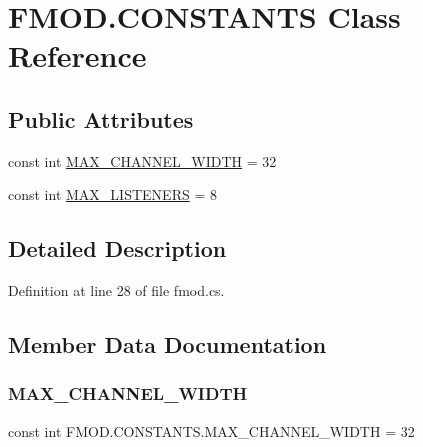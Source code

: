 \hypertarget{class_f_m_o_d_1_1_c_o_n_s_t_a_n_t_s}{}\section{F\+M\+O\+D.\+C\+O\+N\+S\+T\+A\+N\+TS Class Reference}
\label{class_f_m_o_d_1_1_c_o_n_s_t_a_n_t_s}
\subsection*{Public Attributes}
\begin{DoxyCompactItemize}
\item 
const int \hyperlink{class_f_m_o_d_1_1_c_o_n_s_t_a_n_t_s_a70c465f447ef0b0e4a677a4501ab14d0}{M\+A\+X\+\_\+\+C\+H\+A\+N\+N\+E\+L\+\_\+\+W\+I\+D\+TH} = 32
\item 
const int \hyperlink{class_f_m_o_d_1_1_c_o_n_s_t_a_n_t_s_aab9c79951c81cd83f7cf9aa0eaa5b22b}{M\+A\+X\+\_\+\+L\+I\+S\+T\+E\+N\+E\+RS} = 8
\end{DoxyCompactItemize}


\subsection{Detailed Description}


Definition at line 28 of file fmod.\+cs.



\subsection{Member Data Documentation}
\mbox{\label{class_f_m_o_d_1_1_c_o_n_s_t_a_n_t_s_a70c465f447ef0b0e4a677a4501ab14d0}} 
\subsubsection{\texorpdfstring{M\+A\+X\+\_\+\+C\+H\+A\+N\+N\+E\+L\+\_\+\+W\+I\+D\+TH}{MAX\_CHANNEL\_WIDTH}}
{\footnotesize\ttfamily const int F\+M\+O\+D.\+C\+O\+N\+S\+T\+A\+N\+T\+S.\+M\+A\+X\+\_\+\+C\+H\+A\+N\+N\+E\+L\+\_\+\+W\+I\+D\+TH = 32}



